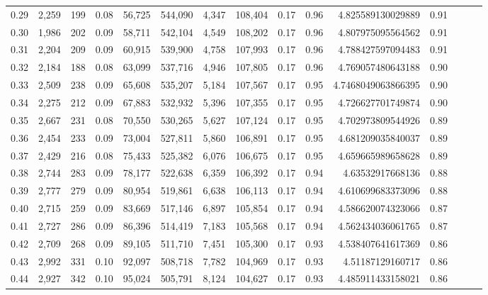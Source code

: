 \begin{tabular}{rrrrrrrrrrrrrrr}
0.29 &   2,259 &    199 &  0.08 &   56,725 &  544,090 &    4,347 &  108,404 &  0.17 &  0.96 &     4.825589130029889 &      0.91 \\
0.30 &   1,986 &    202 &  0.09 &   58,711 &  542,104 &    4,549 &  108,202 &  0.17 &  0.96 &     4.807975095564562 &      0.91 \\
0.31 &   2,204 &    209 &  0.09 &   60,915 &  539,900 &    4,758 &  107,993 &  0.17 &  0.96 &     4.788427597094483 &      0.91 \\
0.32 &   2,184 &    188 &  0.08 &   63,099 &  537,716 &    4,946 &  107,805 &  0.17 &  0.96 &     4.769057480643188 &      0.90 \\
0.33 &   2,509 &    238 &  0.09 &   65,608 &  535,207 &    5,184 &  107,567 &  0.17 &  0.95 &    4.7468049063866395 &      0.90 \\
0.34 &   2,275 &    212 &  0.09 &   67,883 &  532,932 &    5,396 &  107,355 &  0.17 &  0.95 &     4.726627701749874 &      0.90 \\
0.35 &   2,667 &    231 &  0.08 &   70,550 &  530,265 &    5,627 &  107,124 &  0.17 &  0.95 &     4.702973809544926 &      0.89 \\
0.36 &   2,454 &    233 &  0.09 &   73,004 &  527,811 &    5,860 &  106,891 &  0.17 &  0.95 &     4.681209035840037 &      0.89 \\
0.37 &   2,429 &    216 &  0.08 &   75,433 &  525,382 &    6,076 &  106,675 &  0.17 &  0.95 &     4.659665989658628 &      0.89 \\
0.38 &   2,744 &    283 &  0.09 &   78,177 &  522,638 &    6,359 &  106,392 &  0.17 &  0.94 &      4.63532917668136 &      0.88 \\
0.39 &   2,777 &    279 &  0.09 &   80,954 &  519,861 &    6,638 &  106,113 &  0.17 &  0.94 &     4.610699683373096 &      0.88 \\
0.40 &   2,715 &    259 &  0.09 &   83,669 &  517,146 &    6,897 &  105,854 &  0.17 &  0.94 &     4.586620074323066 &      0.87 \\
0.41 &   2,727 &    286 &  0.09 &   86,396 &  514,419 &    7,183 &  105,568 &  0.17 &  0.94 &     4.562434036061765 &      0.87 \\
0.42 &   2,709 &    268 &  0.09 &   89,105 &  511,710 &    7,451 &  105,300 &  0.17 &  0.93 &     4.538407641617369 &      0.86 \\
0.43 &   2,992 &    331 &  0.10 &   92,097 &  508,718 &    7,782 &  104,969 &  0.17 &  0.93 &      4.51187129160717 &      0.86 \\
0.44 &   2,927 &    342 &  0.10 &   95,024 &  505,791 &    8,124 &  104,627 &  0.17 &  0.93 &     4.485911433158021 &      0.86 \\

\end{tabular}
